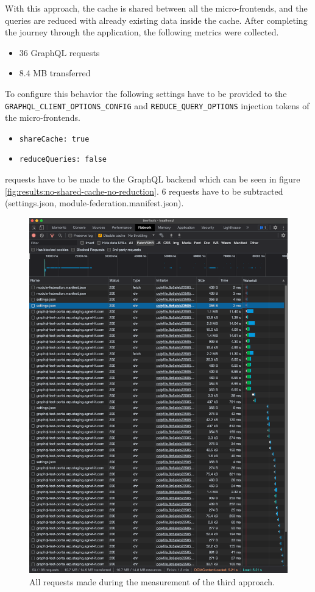 With this approach, the cache is shared between all the micro-frontends, and the queries are reduced with already existing data inside the cache. After completing the journey through the application, the following metrics were collected.

\begin{itemize}
  \item 36 GraphQL requests
  \item 8.4 MB transferred
\end{itemize}

\noindent To configure this behavior the following settings have to be provided to the \texttt{GRAPHQL\_CLIENT\_OPTIONS\_CONFIG} and \texttt{REDUCE\_QUERY\_OPTIONS} injection tokens of the micro-frontends.

\begin{itemize}
  \item \texttt{shareCache: true}
  \item \texttt{reduceQueries: false}
\end{itemize}

 requests have to be made to the GraphQL backend which can be seen in figure \ref{fig:results:no-shared-cache-no-reduction}. 6 requests have to be subtracted (settings.json, module-federation.manifest.json).

\ifshowImages
\begin{figure}[H]
\centering
\includegraphics[width=0.6\linewidth]{images/results/1-attempt/no-shared-cache-no-reduction.png}
\caption{All requests made during the measurement of the third approach.}\label{fig:results:shared-cache-reduction}
\end{figure}
\fi

